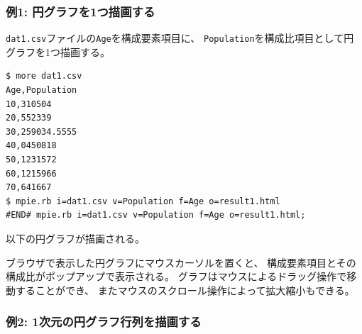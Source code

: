 \subsubsection*{例1: 円グラフを1つ描画する}

\verb|dat1.csv|ファイルの\verb|Age|を構成要素項目に、
\verb|Population|を構成比項目として円グラフを1つ描画する。

\begin{Verbatim}[baselinestretch=0.6,frame=single]
$ more dat1.csv
Age,Population
10,310504
20,552339
30,259034.5555
40,0450818
50,1231572
60,1215966
70,641667
$ mpie.rb i=dat1.csv v=Population f=Age o=result1.html
#END# mpie.rb i=dat1.csv v=Population f=Age o=result1.html;
\end{Verbatim}

以下の円グラフが描画される。

ブラウザで表示した円グラフにマウスカーソルを置くと、
構成要素項目とその構成比がポップアップで表示される。
グラフはマウスによるドラッグ操作で移動することができ、
またマウスのスクロール操作によって拡大縮小もできる。

\begin{flushleft}
\end{flushleft}

\subsubsection*{例2: 1次元の円グラフ行列を描画する}

